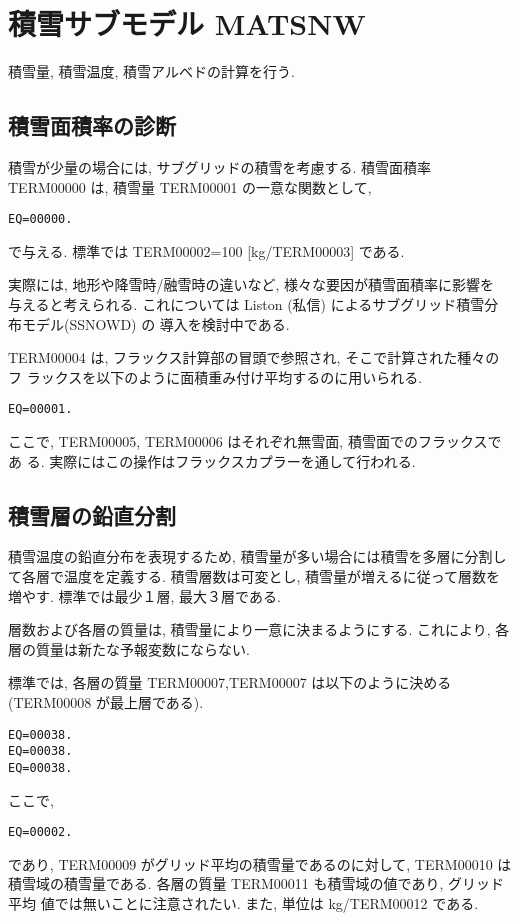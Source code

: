 \section{積雪サブモデル MATSNW}

積雪量, 積雪温度, 積雪アルベドの計算を行う.

\subsection{積雪面積率の診断}

積雪が少量の場合には, サブグリッドの積雪を考慮する.
積雪面積率 TERM00000 は, 積雪量 TERM00001 の一意な関数として,
\begin{verbatim}
EQ=00000.
\end{verbatim}
で与える. 標準では TERM00002=100 [kg/TERM00003] である.

実際には, 地形や降雪時/融雪時の違いなど, 様々な要因が積雪面積率に影響を
与えると考えられる.
これについては Liston (私信) によるサブグリッド積雪分布モデル(SSNOWD) の
導入を検討中である.

TERM00004 は, フラックス計算部の冒頭で参照され, そこで計算された種々のフ
ラックスを以下のように面積重み付け平均するのに用いられる.
\begin{verbatim}
EQ=00001.
\end{verbatim}
ここで, TERM00005, TERM00006 はそれぞれ無雪面, 積雪面でのフラックスであ
る. 実際にはこの操作はフラックスカプラーを通して行われる.

\subsection{積雪層の鉛直分割}

積雪温度の鉛直分布を表現するため, 積雪量が多い場合には積雪を多層に分割し
て各層で温度を定義する.
積雪層数は可変とし, 積雪量が増えるに従って層数を増やす. 標準では最少１層,
最大３層である.

層数および各層の質量は, 積雪量により一意に決まるようにする. これにより,
各層の質量は新たな予報変数にならない.

標準では, 各層の質量 TERM00007,TERM00007 は以下のように決める
(TERM00008 が最上層である).
\begin{verbatim}
EQ=00038.
EQ=00038.
EQ=00038.
\end{verbatim}
ここで,
\begin{verbatim}
EQ=00002.
\end{verbatim}
であり, TERM00009 がグリッド平均の積雪量であるのに対して, TERM00010 は
積雪域の積雪量である.
各層の質量 TERM00011 も積雪域の値であり, グリッド平均
値では無いことに注意されたい.
また, 単位は kg/TERM00012 である.

